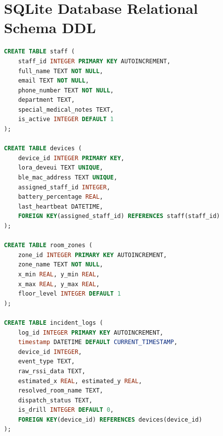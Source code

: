 \section{SQLite Database Relational Schema DDL}
\begin{lstlisting}[language=SQL, caption={Relational SQLite Database Table Definitions}]
CREATE TABLE staff (
    staff_id INTEGER PRIMARY KEY AUTOINCREMENT,
    full_name TEXT NOT NULL,
    email TEXT NOT NULL,
    phone_number TEXT NOT NULL,
    department TEXT,
    special_medical_notes TEXT,
    is_active INTEGER DEFAULT 1
);

CREATE TABLE devices (
    device_id INTEGER PRIMARY KEY,
    lora_deveui TEXT UNIQUE,
    ble_mac_address TEXT UNIQUE,
    assigned_staff_id INTEGER,
    battery_percentage REAL,
    last_heartbeat DATETIME,
    FOREIGN KEY(assigned_staff_id) REFERENCES staff(staff_id)
);

CREATE TABLE room_zones (
    zone_id INTEGER PRIMARY KEY AUTOINCREMENT,
    zone_name TEXT NOT NULL,
    x_min REAL, y_min REAL,
    x_max REAL, y_max REAL,
    floor_level INTEGER DEFAULT 1
);

CREATE TABLE incident_logs (
    log_id INTEGER PRIMARY KEY AUTOINCREMENT,
    timestamp DATETIME DEFAULT CURRENT_TIMESTAMP,
    device_id INTEGER,
    event_type TEXT,
    raw_rssi_data TEXT,
    estimated_x REAL, estimated_y REAL,
    resolved_room_name TEXT,
    dispatch_status TEXT,
    is_drill INTEGER DEFAULT 0,
    FOREIGN KEY(device_id) REFERENCES devices(device_id)
);
\end{lstlisting}

